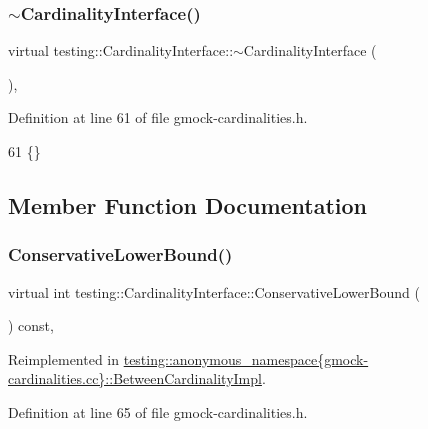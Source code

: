 \subsubsection{\texorpdfstring{$\sim$\+Cardinality\+Interface()}{~CardinalityInterface()}}
{\footnotesize\ttfamily virtual testing\+::\+Cardinality\+Interface\+::$\sim$\+Cardinality\+Interface (\begin{DoxyParamCaption}{ }\end{DoxyParamCaption})\hspace{0.3cm}{\ttfamily [inline]}, {\ttfamily [virtual]}}



Definition at line 61 of file gmock-\/cardinalities.\+h.


\begin{DoxyCode}
61 \{\}
\end{DoxyCode}


\subsection{Member Function Documentation}
\mbox{\label{classtesting_1_1CardinalityInterface_a1aff90c45ff45658fee99d15fd0a6f89}} 
\subsubsection{\texorpdfstring{Conservative\+Lower\+Bound()}{ConservativeLowerBound()}}
{\footnotesize\ttfamily virtual int testing\+::\+Cardinality\+Interface\+::\+Conservative\+Lower\+Bound (\begin{DoxyParamCaption}{ }\end{DoxyParamCaption}) const\hspace{0.3cm}{\ttfamily [inline]}, {\ttfamily [virtual]}}



Reimplemented in \hyperlink{classtesting_1_1anonymous__namespace_02gmock-cardinalities_8cc_03_1_1BetweenCardinalityImpl_ab1e15ef66d93b5080bc8e15ec40248bb}{testing\+::anonymous\+\_\+namespace\{gmock-\/cardinalities.\+cc\}\+::\+Between\+Cardinality\+Impl}.



Definition at line 65 of file gmock-\/cardinalities.\+h.


